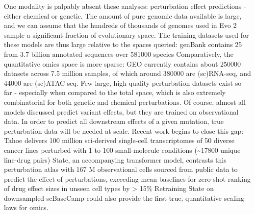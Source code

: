 One modality is palpably absent these analyses: perturbation effect predictions - either chemical or genetic. The amount of pure genomic data available is large, and we can assume that the hundreds of thousands of genomes used in Evo 2 sample a significant fraction of evolutionary space. The training datasets used for these models are thus large relative to the spaces queried: genBank contains \SI{25}{\tera\bp} from 3.7 billion annotated sequences over \num{581000} species Comparatively, the quantitative omics space is more sparse: GEO currently contains about \num{250000} datasets across 7.5 million samples, of which around \num{380000} are (sc)RNA-seq, and \num{44000} are (sc)ATAC-seq. Few large, high-quality perturbation datasets exist so far - especially when compared to the total space, which is also extremely combinatorial for both genetic and chemical perturbations. Of course, almost all models discussed predict variant effects, but they are trained on observational data. In order to predict all downstream effects of a given mutation, true perturbation data will be needed at scale. Recent work begins to close this gap: Tahoe delivers 100 million sci-derived single-cell transcriptomes of 50 diverse cancer lines perturbed with 1 to 100 small-molecule conditions (\textasciitilde\num{17800} unique line-drug pairs) State, an accompanying transformer model, contrasts this perturbation atlas with 167 M observational cells sourced from public data to predict the effect of perturbations, exceeding mean-baselines for zero-shot ranking of drug effect sizes in unseen cell types by > 15\% Retraining State on downsampled scBaseCamp could also provide the first true, quantitative scaling laws for omics.



